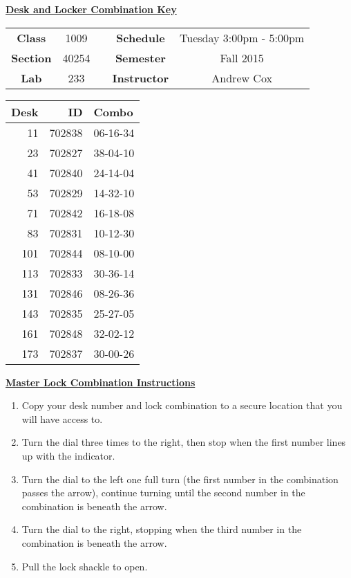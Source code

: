 \documentclass[12pt]{article}
\begin{document}
\thispagestyle{empty}

\begin{center}
	{\huge\textbf{\underline{ Desk and Locker Combination Key}}}
\end{center}


\begin{table}[h]
  \centering
  \begin{tabular}{ccccc}

  \textbf{Class} & 1009 & {\qquad} &\textbf{Schedule} & Tuesday 3:00pm - 5:00pm \\
  \textbf{Section} & 40254 & {\qquad} & \textbf{Semester} & Fall 2015 \\
  \textbf{Lab} & 233 & {\qquad} & \textbf{Instructor} & Andrew Cox \\
  \end{tabular}
\end{table}
 \vspace{0.5in}
\begin{minipage}{0.4\textwidth}

\begin{tabular}{rrl}
\toprule
 Desk &      ID &     Combo \\
\midrule
   11 &  702838 &  06-16-34 \\
   23 &  702827 &  38-04-10 \\
   41 &  702840 &  24-14-04 \\
   53 &  702829 &  14-32-10 \\
   71 &  702842 &  16-18-08 \\
   83 &  702831 &  10-12-30 \\
  101 &  702844 &  08-10-00 \\
  113 &  702833 &  30-36-14 \\
  131 &  702846 &  08-26-36 \\
  143 &  702835 &  25-27-05 \\
  161 &  702848 &  32-02-12 \\
  173 &  702837 &  30-00-26 \\
\bottomrule
\end{tabular}


\end{minipage}
\begin{minipage}{0.4\textwidth}
\underline{{\large \textbf{Master Lock Combination Instructions}}}
\begin{enumerate}
\item Copy your desk number and lock combination to a secure location that you will have access to.
\item Turn the dial three times to the right, then stop when the first number lines up with the indicator.
\item Turn the dial to the left one full turn (the first number in the combination passes the arrow), continue turning until the second number in the combination is beneath the arrow.
\item Turn the dial to the right, stopping when the third number in the combination is beneath the arrow.
\item Pull the lock shackle to open.
\end{enumerate}
\end{minipage}
\end{document}
